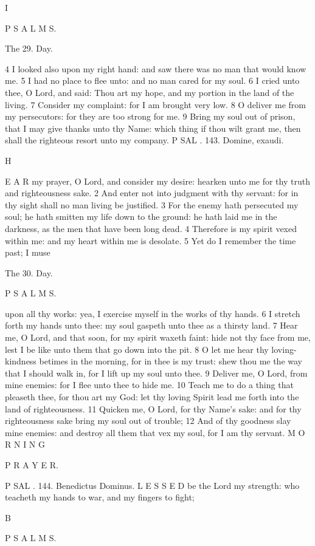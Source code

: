 I

P S A L M S.

The 29. Day.

4 I looked also upon my right hand: and saw there was no man that would know me. 5 I had no place to flee unto: and no man cared for my soul. 6 I cried unto thee, O Lord, and said: Thou art my hope, and my portion in the land of the living. 7 Consider my complaint: for I am brought very low. 8 O deliver me from my persecutors: for they are too strong for me. 9 Bring my soul out of prison, that I may give thanks unto thy Name: which thing if thou wilt grant me, then shall the righteous resort unto my company. P SAL . 143. Domine, exaudi.

H

E A R my prayer, O Lord, and consider my desire: hearken unto me for thy truth and righteousness sake. 2 And enter not into judgment with thy servant: for in thy sight shall no man living be justified. 3 For the enemy hath persecuted my soul; he hath smitten my life down to the ground: he hath laid me in the darkness, as the men that have been long dead. 4 Therefore is my spirit vexed within me: and my heart within me is desolate. 5 Yet do I remember the time past; I muse

The 30. Day.

P S A L M S.

upon all thy works: yea, I exercise myself in the works of thy hands. 6 I stretch forth my hands unto thee: my soul gaspeth unto thee as a thirsty land. 7 Hear me, O Lord, and that soon, for my spirit waxeth faint: hide not thy face from me, lest I be like unto them that go down into the pit. 8 O let me hear thy loving-kindness betimes in the morning, for in thee is my trust: shew thou me the way that I should walk in, for I lift up my soul unto thee. 9 Deliver me, O Lord, from mine enemies: for I flee unto thee to hide me. 10 Teach me to do a thing that pleaseth thee, for thou art my God: let thy loving Spirit lead me forth into the land of righteousness. 11 Quicken me, O Lord, for thy Name’s sake: and for thy righteousness sake bring my soul out of trouble; 12 And of thy goodness slay mine enemies: and destroy all them that vex my soul, for I am thy servant. M O R N I N G

P R A Y E R.

P SAL . 144. Benedictus Dominus. L E S S E D be the Lord my strength: who teacheth my hands to war, and my fingers to fight;

B

P S A L M S.

